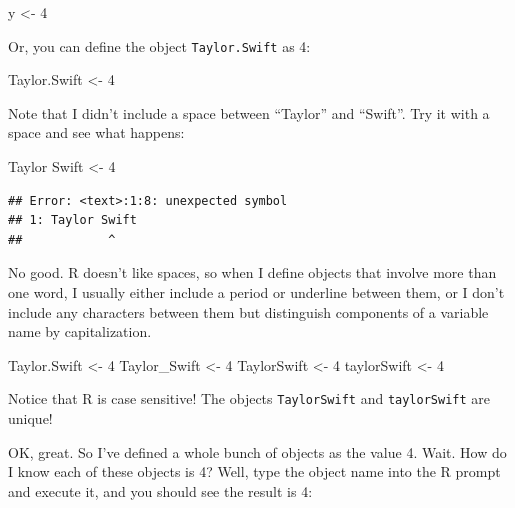 \documentclass[
]{book}
\newenvironment{Shaded}{\begin{snugshade}}{\end{snugshade}}
\newcommand{\DecValTok}[1]{\textcolor[rgb]{0.00,0.00,0.81}{#1}}
\newcommand{\NormalTok}[1]{#1}
\newcommand{\OtherTok}[1]{\textcolor[rgb]{0.56,0.35,0.01}{#1}}
\begin{document}
\begin{Shaded}
\begin{Highlighting}[]
\NormalTok{y }\OtherTok{\textless{}{-}} \DecValTok{4}
\end{Highlighting}
\end{Shaded}

Or, you can define the object \texttt{Taylor.Swift} as 4:

\begin{Shaded}
\begin{Highlighting}[]
\NormalTok{Taylor.Swift }\OtherTok{\textless{}{-}} \DecValTok{4}
\end{Highlighting}
\end{Shaded}

Note that I didn't include a space between ``Taylor'' and ``Swift''. Try it with a space and see what happens:

\begin{Shaded}
\begin{Highlighting}[]
\NormalTok{Taylor Swift }\OtherTok{\textless{}{-}} \DecValTok{4}
\end{Highlighting}
\end{Shaded}

\begin{verbatim}
## Error: <text>:1:8: unexpected symbol
## 1: Taylor Swift
##            ^
\end{verbatim}

No good. R doesn't like spaces, so when I define objects that involve more than one word, I usually either include a period or underline between them, or I don't include any characters between them but distinguish components of a variable name by capitalization.

\begin{Shaded}
\begin{Highlighting}[]
\NormalTok{Taylor.Swift }\OtherTok{\textless{}{-}} \DecValTok{4}
\NormalTok{Taylor\_Swift }\OtherTok{\textless{}{-}} \DecValTok{4}
\NormalTok{TaylorSwift }\OtherTok{\textless{}{-}} \DecValTok{4}
\NormalTok{taylorSwift }\OtherTok{\textless{}{-}} \DecValTok{4}
\end{Highlighting}
\end{Shaded}

Notice that R is case sensitive! The objects \texttt{TaylorSwift} and \texttt{taylorSwift} are unique!

OK, great. So I've defined a whole bunch of objects as the value 4. Wait. How do I know each of these objects is 4? Well, type the object name into the R prompt and execute it, and you should see the result is 4:
\end{document}
